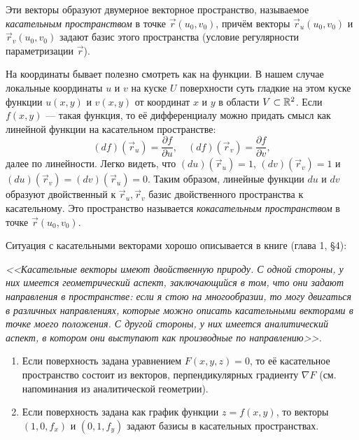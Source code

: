 Эти векторы образуют двумерное векторное пространство, называемое \textit{касательным пространством} в точке $\vec{r}(u_0, v_0)$, причём векторы $\vec{r}_u(u_0, v_0)$ и $\vec{r}_v(u_0, v_0)$ задают базис этого пространства (условие регулярности параметризации $\vec{r}$).

На координаты бывает полезно смотреть как на функции. В нашем случае локальные координаты $u$ и $v$ на куске $U$ поверхности суть гладкие на этом куске функции $u(x, y)$ и $v(x, y)$ от координат $x$ и $y$ в области $V \subset \mathbb{R}^2$. Если $f(x, y)$ --- такая функция, то её дифференциалу можно придать смысл как линейной функции на касательном пространстве:
\[
	(df)(\vec{r}_u) = \frac{\partial f}{\partial u},\quad(df)(\vec{r}_v) = \frac{\partial f}{\partial v},
\]
далее по линейности. Легко видеть, что $(du)(\vec{r}_u) = 1$, $(dv)(\vec{r}_v) = 1$ и $(du)(\vec{r}_v) = (dv)(\vec{r}_u) = 0$. Таким образом, линейные функции $du$ и $dv$ образуют двойственный к $\vec{r}_u, \vec{r}_v$ базис двойственного пространства к касательному. Это пространство называется \textit{кокасательным пространством} в точке $\vec{r}(u_0, v_0)$.

Ситуация с касательными векторами хорошо описывается в книге \cite{S19} (глава 1, \S 4):

\begin{center}
	\textit{<<Касательные векторы имеют двойственную природу. С одной стороны, у них имеется геометрический аспект, заключающийся в том, что они задают направления в пространстве: если я стою на многообразии, то могу двигаться в различных направлениях, которые можно описать касательными векторами в точке моего положения. С другой стороны, у них имеется аналитический аспект, в котором они выступают как \glqq производные по направлению\grqq>>.}
\end{center}

\begin{example}
	\begin{enumerate}[nolistsep, label=(\arabic*)]
		\item Если поверхность задана уравнением $F(x, y, z) = 0$, то её касательное пространство состоит из векторов, перпендикулярных градиенту $\nabla F$ (см. напоминания из аналитической геометрии).
		\item Если поверхность задана как график функции $z = f(x, y)$, то векторы $(1, 0, f_x)$ и $(0, 1, f_y)$ задают базисы в касательных пространствах.
	\end{enumerate}
\end{example}


